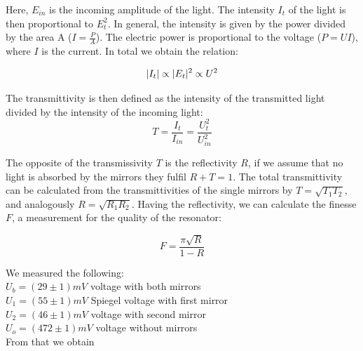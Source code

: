 \documentclass{article}
\DeclarePairedDelimiter\abs{\lvert}{\rvert}%
\begin{document}
Here, $E_{in}$ is the incoming amplitude of the light. The intensity $I_{t}$ of the light is then proportional to $E_{t}^{2}$. In general, the intensity is given by the power divided by the area A ($I=\frac{P}{A}$). The electric power is proportional to the voltage ($P=UI$), where $I$ is the current. In total we obtain the relation:

\begin{equation}
\abs{I_{t}} \propto \abs{E_{t}}^{2} \propto U^{2}
\end{equation}

The transmittivity is then defined as the intensity of the transmitted light divided by the intensity of the incoming light:
\begin{equation}
T = \frac{I_{t}}{I_{in}} = \frac{U_{t}^{2}}{U_{in}^{2}}
\label{transmittivitybyvoltage}
\end{equation}

The opposite of the transmissivity $T$ is the reflectivity $R$, if we assume that no light is absorbed by the mirrors they fulfil $R+T=1$. The total transmittivity can be calculated from the transmittivities of the single mirrors by $T = \sqrt{T_{1}T_{2}}$, and analogously  $R = \sqrt{R_{1}R_{2}}$. Having the reflectivity, we can calculate the finesse $F$, a measurement for the quality of the resonator:

\begin{equation}
F= \frac{\pi\sqrt{R}}{1-R}
\end{equation}

We measured the following:\\
$U_b = (29\pm1)mV$ voltage with both mirrors\\
$U_1 = (55\pm1)mV$  Spiegel voltage with first mirror\\
$U_2 = (46\pm1)mV$  voltage with second mirror\\
$U_o = (472\pm1)mV$ voltage without mirrors\\

From that we obtain \\
\end{document}
